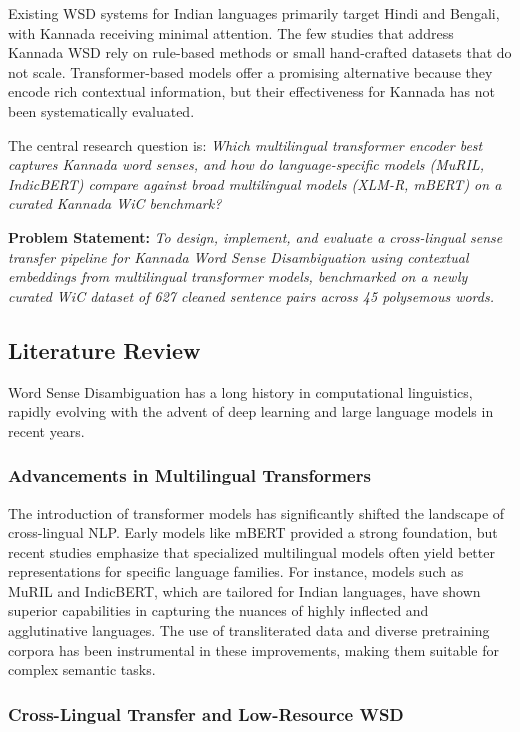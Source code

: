 \documentclass[12pt,a4paper,oneside]{article}
\begin{document}
Existing WSD systems for Indian languages primarily target Hindi and Bengali, with Kannada receiving minimal attention. The few studies that address Kannada WSD rely on rule-based methods or small hand-crafted datasets that do not scale. Transformer-based models offer a promising alternative because they encode rich contextual information, but their effectiveness for Kannada has not been systematically evaluated.

The central research question is: \textit{Which multilingual transformer encoder best captures Kannada word senses, and how do language-specific models (MuRIL, IndicBERT) compare against broad multilingual models (XLM-R, mBERT) on a curated Kannada WiC benchmark?}

\vspace{0.5cm}
\noindent\textbf{Problem Statement:} \textit{To design, implement, and evaluate a cross-lingual sense transfer pipeline for Kannada Word Sense Disambiguation using contextual embeddings from multilingual transformer models, benchmarked on a newly curated WiC dataset of 627 cleaned sentence pairs across 45 polysemous words.}

\subsection{Literature Review}

Word Sense Disambiguation has a long history in computational linguistics, rapidly evolving with the advent of deep learning and large language models in recent years.

\subsubsection{Advancements in Multilingual Transformers}

The introduction of transformer models has significantly shifted the landscape of cross-lingual NLP. Early models like mBERT provided a strong foundation, but recent studies emphasize that specialized multilingual models often yield better representations for specific language families. For instance, models such as MuRIL and IndicBERT, which are tailored for Indian languages, have shown superior capabilities in capturing the nuances of highly inflected and agglutinative languages. The use of transliterated data and diverse pretraining corpora has been instrumental in these improvements, making them suitable for complex semantic tasks.

\subsubsection{Cross-Lingual Transfer and Low-Resource WSD}
\end{document}
